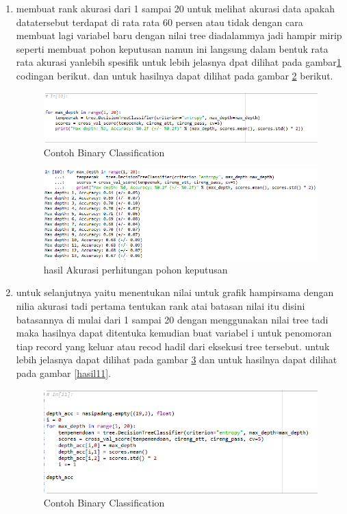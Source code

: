 \begin{enumerate}
\item membuat rank akurasi dari 1 sampai 20 untuk melihat akurasi data apakah datatersebut terdapat di rata rata 60 persen atau tidak dengan cara membuat lagi variabel baru dengan nilai tree diadalammya jadi hampir mirip seperti membuat pohon keputusan namun ini langsung dalam bentuk rata rata akurasi yanlebih spesifik untuk lebih jelasnya dpat dilihat pada gambar\ref{c28} codingan berikut. dan untuk hasilnya dapat dilihat pada gambar \ref{hasil10} berikut.

\begin{figure}[ht]
      \centerline{\includegraphics[width=1\textwidth]
      {figures/cokro/c28}}
      \caption{Contoh Binary Classification}
      \label{c28}
      \end{figure}

\begin{figure}[ht]
      \centerline{\includegraphics[width=1\textwidth]
      {figures/cokro/hasil10}}
      \caption{hasil Akurasi perhitungan pohon keputusan }
      \label{hasil10}
      \end{figure}

\item untuk selanjutnya yaitu menentukan nilai untuk grafik hampirsama dengan nilia akurasi tadi pertama tentukan rank atai batasan nilai itu disini batasannya di mulai dari 1 sampai 20 dengan menggunakan nilai tree tadi maka hasilnya dapat ditentuka kemudian buat variabel i untuk penomoran tiap record yang keluar atau recod hadil dari eksekusi tree tersebut. untuk lebih jelasnya dapat dilihat pada gambar \ref{c29} dan untuk hasilnya dapat dilihat pada gambar \ref{hasil11}.

\begin{figure}[ht]
      \centerline{\includegraphics[width=1\textwidth]
      {figures/cokro/c29}}
      \caption{Contoh Binary Classification}
      \label{c29}
      \end{figure}


\end{enumerate}
